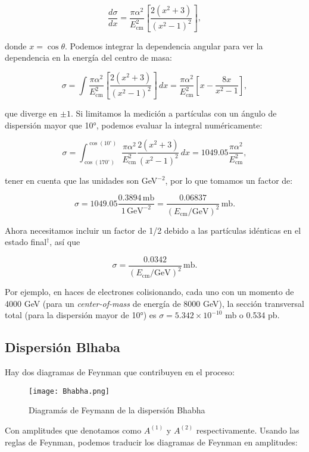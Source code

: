 \begin{equation}
\frac{d\sigma}{dx} = \frac{\pi \alpha^2}{E_{\text{cm}}^2} \left[ \frac{2 (x^2 + 3)}{(x^2 - 1)^2} \right],
\end{equation}

donde $x = \cos \theta$. Podemos integrar la dependencia angular para ver la dependencia en la energía del centro de masa:

\begin{equation}
\sigma = \int \frac{\pi \alpha^2}{E_{\text{cm}}^2} \left[ \frac{2 (x^2 + 3)}{(x^2 - 1)^2} \right] \, dx = \frac{\pi \alpha^2}{E_{\text{cm}}^2} \left[ x - \frac{8x}{x^2 - 1} \right],
\end{equation}

que diverge en $\pm 1$. Si limitamos la medición a partículas con un ángulo de dispersión mayor que 10°, podemos evaluar la integral numéricamente:

\begin{equation}
\sigma = \int_{\cos(170^\circ)}^{\cos(10^\circ)} \frac{\pi \alpha^2}{E_{\text{cm}}^2} \frac{2 (x^2 + 3)}{(x^2 - 1)^2} \, dx = 1049.05 \frac{\pi \alpha^2}{E_{\text{cm}}^2},
\end{equation}

tener en cuenta que las unidades son GeV$^{-2}$, por lo que tomamos un factor de:

\begin{equation}
\sigma = 1049.05 \frac{0.3894 \, \text{mb}}{1 \, \text{GeV}^{-2}} = \frac{0.06837}{(E_{\text{cm}}/\text{GeV})^2} \, \text{mb}.
\end{equation}

Ahora necesitamos incluir un factor de 1/2 debido a las partículas idénticas en el estado final$^\dagger$, así que

\begin{equation}
\sigma = \frac{0.0342}{(E_{\text{cm}}/\text{GeV})^2} \, \text{mb}.
\end{equation}

Por ejemplo, en haces de electrones colisionando, cada uno con un momento de 4000 GeV (para un \textsl{center-of-mass} de energía de 8000 GeV), la sección transversal total (para la dispersión mayor de 10°) es $\sigma = 5.342 \times 10^{-10}$ mb o 0.534 pb.


\subsection{Dispersión Blhaba}
Hay dos diagramas de Feynman que contribuyen en el proceso:
\begin{figure}
  \centering
  \texttt{[image: Bhabha.png]}
  \caption{Diagramás de Feymann de la dispersión Bhabha}
\end{figure}
Con amplitudes que denotamos como $ A^{(1)} $ y $ A^{(2)} $ respectivamente. Usando las reglas de Feynman, podemos traducir los diagramas de Feynman en amplitudes:

